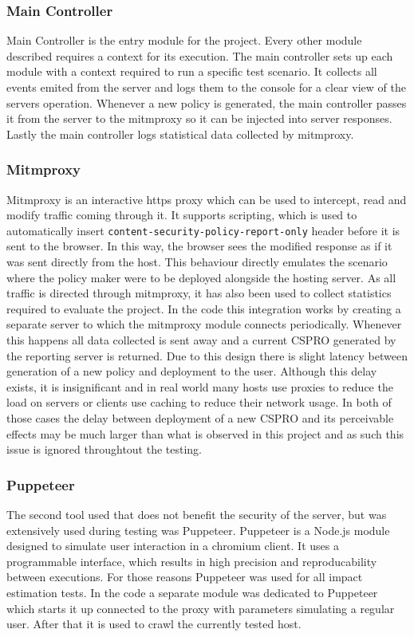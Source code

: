 \begin{description}
\begin{description}
\subsubsection{Main Controller}
Main Controller is the entry module for the project.
Every other module described requires a context for its execution.
The main controller sets up each module with a context required to run a specific test scenario.
It collects all events emited from the server and logs them to the console for a clear view of the servers operation.
Whenever a new policy is generated, the main controller passes it from the server to the mitmproxy so it can be injected into server responses.
Lastly the main controller logs statistical data collected by mitmproxy.

\subsubsection{Mitmproxy}
Mitmproxy is an interactive https proxy which can be used to intercept, read and modify traffic coming through it.
It supports scripting, which is used to automatically insert \texttt{content-security-policy-report-only} header before it is sent to the browser.
In this way, the browser sees the modified response as if it was sent directly from the host.
This behaviour directly emulates the scenario where the policy maker were to be deployed alongside the hosting server.
As all traffic is directed through mitmproxy, it has also been used to collect statistics required to evaluate the project.
In the code this integration works by creating a separate server to which the mitmproxy module connects periodically.
Whenever this happens all data collected is sent away and a current CSPRO generated by the reporting server is returned.
Due to this design there is slight latency between generation of a new policy and deployment to the user.
Although this delay exists, it is insignificant and in real world many hosts use proxies to reduce the load on servers or clients use caching to reduce their network usage.
In both of those cases the delay between deployment of a new CSPRO and its perceivable effects may be much larger than what is observed in this project and as such this issue is ignored throughtout the testing.

\subsubsection{Puppeteer}
The second tool used that does not benefit the security of the server, but was extensively used during testing was Puppeteer.
Puppeteer is a Node.js module designed to simulate user interaction in a chromium client.
It uses a programmable interface, which results in high precision and reproducability between executions.
For those reasons Puppeteer was used for all impact estimation tests.
In the code a separate module was dedicated to Puppeteer which starts it up connected to the proxy with parameters simulating a regular user.
After that it is used to crawl the currently tested host.



\end{description}
\end{description}
